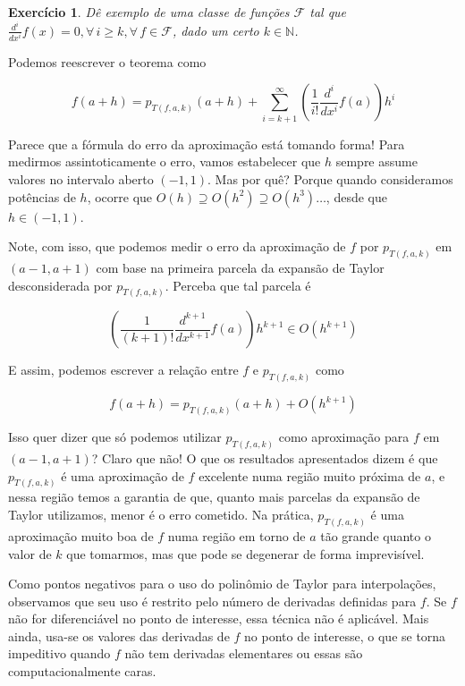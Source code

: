 \documentclass[]{article}
\newtheorem{exercicio}{Exercício}
\numberwithin{equation}{section}
\begin{document}
\begin{exercicio}
  Dê exemplo de uma classe de funções $\mathcal{F}$ tal que
  $\frac{d^i}{dx^i} f(x) = 0, \forall\, i \geq k, \forall\, f \in
  \mathcal{F}$, dado um certo $k \in \mathbb{N}$.
\end{exercicio}

Podemos reescrever o teorema como

$$
f(a + h) = p_{T(f, a, k)}(a + h) + \sum_{i = k + 1}^{\infty}
\left(\frac{1}{i!} \frac{d^i}{dx^i} f(a)\right)h^i
$$

Parece que a fórmula do erro da aproximação está tomando forma! Para
medirmos assintoticamente o erro, vamos estabelecer que $h$ sempre
assume valores no intervalo aberto $(-1, 1)$. Mas por quê? Porque
quando consideramos potências de $h$, ocorre que
$O(h) \supseteq O(h^2) \supseteq O(h^3) \dots$, desde que
$h \in (-1, 1)$.

Note, com isso, que podemos medir o erro da aproximação de $f$ por
$p_{T(f, a, k)}$ em $(a - 1, a + 1)$ com base na primeira parcela da
expansão de Taylor desconsiderada por $p_{T(f, a, k)}$. Perceba que
tal parcela é

$$
\left(\frac{1}{(k + 1)!} \frac{d^{k + 1}}{dx^{k + 1}} f(a)\right)h^{k
  + 1} \in O(h^{k + 1})
$$

E assim, podemos escrever a relação entre $f$ e $p_{T(f, a, k)}$ como

$$
f(a + h) = p_{T(f, a, k)}(a + h) + O(h^{k + 1})
$$

Isso quer dizer que só podemos utilizar $p_{T(f, a, k)}$ como
aproximação para $f$ em $(a - 1, a + 1)$? Claro que não! O que os
resultados apresentados dizem é que $p_{T(f, a, k)}$ é uma aproximação
de $f$ excelente numa região muito próxima de $a$, e nessa região
temos a garantia de que, quanto mais parcelas da expansão de Taylor
utilizamos, menor é o erro cometido. Na prática, $p_{T(f, a, k)}$ é
uma aproximação muito boa de $f$ numa região em torno de $a$ tão
grande quanto o valor de $k$ que tomarmos, mas que pode se degenerar
de forma imprevisível.

Como pontos negativos para o uso do polinômio de Taylor para
interpolações, observamos que seu uso é restrito pelo número de
derivadas definidas para $f$. Se $f$ não for diferenciável no ponto de
interesse, essa técnica não é aplicável. Mais ainda, usa-se os valores
das derivadas de $f$ no ponto de interesse, o que se torna impeditivo
quando $f$ não tem derivadas elementares ou essas são
computacionalmente caras.
\end{document}

